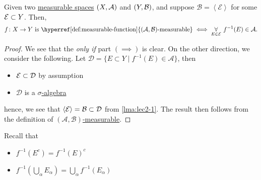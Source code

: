\begin{lemma}\label{lma:lec10-1}
	Given two \hyperref[def:measurable-space]{measurable spaces} \((X, \mathcal{\MakeUppercase{a}} )\) and \((Y, \mathcal{\MakeUppercase{b}} )\), and suppose
	\(\mathcal{B} = \left< \mathcal{E}  \right> \) for some \(\mathcal{\MakeUppercase{e}} \subset Y\). Then,
	\[
		f\colon X\to Y \text{ is \hyperref[def:measurable-function]{\((\mathcal{A} , \mathcal{B})\)-measurable}}\iff \underset{E\in\mathcal{E}}{\forall}\ f^{-1} (E)\in \mathcal{A}.
	\]
\end{lemma}
\begin{proof}
	We see that the \emph{only if} part \((\implies )\) is clear. On the other direction, we consider the following. Let
	\(\mathcal{D} = \{E\subset Y \mid f^{-1} (E)\in \mathcal{A} \}\), then
	\begin{itemize}
		\item \(\mathcal{\MakeUppercase{e}} \subset \mathcal{D} \) by assumption
		\item \(\mathcal{D} \) is a \hyperref[def:sigma-algebra]{\(\sigma\)-algebra} 
	\end{itemize}
	hence, we see that \(\left< \mathcal{E} \right> = \mathcal{\MakeUppercase{b}} \subset \mathcal{D} \) from \autoref{lma:lec2-1}. The result then
	follows from the definition of \hyperref[def:measurable-function]{\((\mathcal{A} , \mathcal{B} )\)-measurable}.
\end{proof}
\begin{note}
	Recall that
	\begin{itemize}
		\item \(f^{-1} (E^{c} ) = f^{-1} (E)^{c} \)
		\item \(f^{-1} \left(\bigcup\limits_{\alpha} E_{\alpha }\right) = \bigcup\limits_{\alpha} f^{-1} (E_{\alpha })\)
	\end{itemize}
\end{note}

